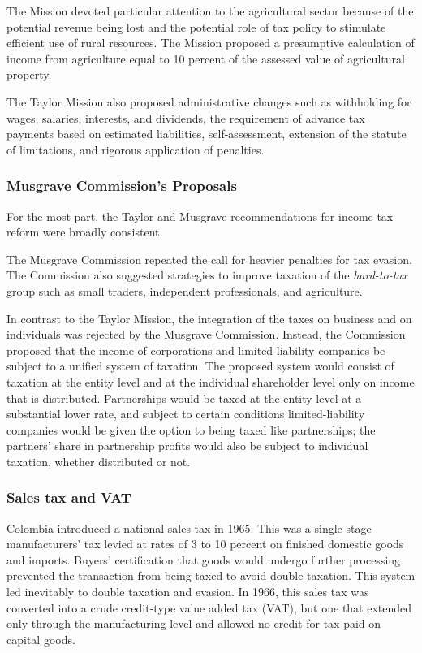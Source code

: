 \documentclass[
  12pt]{article}
\theoremstyle{definition}
\theoremstyle{remark}
\begin{document}
The Mission devoted particular attention to the agricultural sector
because of the potential revenue being lost and the potential role of
tax policy to stimulate efficient use of rural resources. The Mission
proposed a presumptive calculation of income from agriculture equal to
10 percent of the assessed value of agricultural property.

The Taylor Mission also proposed administrative changes such as
withholding for wages, salaries, interests, and dividends, the
requirement of advance tax payments based on estimated liabilities,
self-assessment, extension of the statute of limitations, and rigorous
application of penalties.

\subsubsection{Musgrave Commission's
Proposals}\label{musgrave-commissions-proposals}

For the most part, the Taylor and Musgrave recommendations for income
tax reform were broadly consistent.

The Musgrave Commission repeated the call for heavier penalties for tax
evasion. The Commission also suggested strategies to improve taxation of
the \emph{hard-to-tax} group such as small traders, independent
professionals, and agriculture.

In contrast to the Taylor Mission, the integration of the taxes on
business and on individuals was rejected by the Musgrave Commission.
Instead, the Commission proposed that the income of corporations and
limited-liability companies be subject to a unified system of taxation.
The proposed system would consist of taxation at the entity level and at
the individual shareholder level only on income that is distributed.
Partnerships would be taxed at the entity level at a substantial lower
rate, and subject to certain conditions limited-liability companies
would be given the option to being taxed like partnerships; the
partners' share in partnership profits would also be subject to
individual taxation, whether distributed or not.

\subsubsection{Sales tax and VAT}\label{sales-tax-and-vat}

Colombia introduced a national sales tax in 1965. This was a
single-stage manufacturers' tax levied at rates of 3 to 10 percent on
finished domestic goods and imports. Buyers' certification that goods
would undergo further processing prevented the transaction from being
taxed to avoid double taxation. This system led inevitably to double
taxation and evasion. In 1966, this sales tax was converted into a crude
credit-type value added tax (VAT), but one that extended only through
the manufacturing level and allowed no credit for tax paid on capital
goods.
\end{document}
